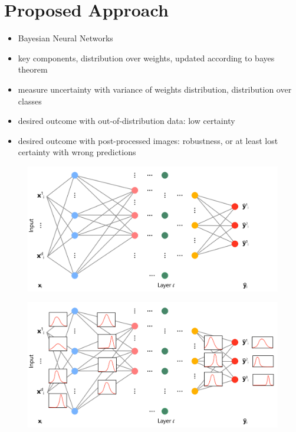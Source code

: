 \documentclass[fleqn,compress,utf8,aspectratio=169,t,handout]{beamer}
\begin{document}
\section{Proposed Approach}
\begin{frame}
\begin{itemize}
    \item Bayesian Neural Networks
    \item key components, distribution over weights, updated according to bayes theorem
    \item measure uncertainty with variance of weights distribution, distribution over classes
    \item desired outcome with out-of-distribution data: low certainty
    \item desired outcome with post-processed images: robustness, or at least lost certainty with wrong predictions
\end{itemize}
\end{frame}

\begin{frame}
  \begin{figure}
    \includegraphics[width = 0.9 \textwidth]{figs/Ann.png}
  \end{figure}
\end{frame}

\begin{frame}
  \begin{figure}
    \includegraphics[width = 0.9 \textwidth]{figs/Bnn.png}
  \end{figure}
\end{frame}
\end{document}

